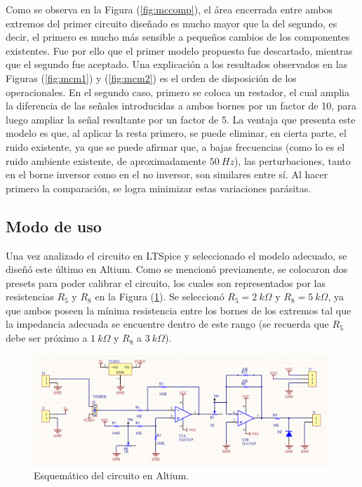 Como se observa en la Figura (\ref{fig:mccomp}), el área encerrada entre ambos extremos del primer circuito diseñado es mucho mayor que la del segundo, es decir, el primero es mucho más sensible a pequeños cambios de los componentes existentes. Fue por ello que el primer modelo propuesto fue descartado, mientras que el segundo fue aceptado. 
Una explicación a los resultados observados en las Figuras (\ref{fig:mcm1}) y (\ref{fig:mcm2}) es el orden de disposición de los operacionales. En el segundo caso, primero se coloca un restador, el cual amplia la diferencia de las señales introducidas a ambos bornes por un factor de 10, para luego ampliar la señal resultante por un factor de 5. La ventaja que presenta este modelo es que, al aplicar la resta primero, se puede eliminar, en cierta parte, el ruido existente, ya que se puede afirmar que, a bajas frecuencias (como lo es el ruido ambiente existente, de aproximadamente $50 \ Hz$), las perturbaciones, tanto en el borne inversor como en el no inversor, son similares entre sí. Al hacer primero la comparación, se logra minimizar estas variaciones parásitas.

\subsection{Modo de uso}

Una vez analizado el circuito en LTSpice y seleccionado el modelo adecuado, se diseñó este último en Altium. Como se mencionó previamente, se colocaron dos presets para poder calibrar el circuito, los cuales son representados por las resistencias $R_5$ y $R_8$ en la Figura (\ref{fig:schematic}). Se seleccionó $R_5 = 2 \ k\Omega$ y $R_8 = 5 \ k\Omega$, ya que ambos poseen la mínima resistencia entre los bornes de los extremos tal que la impedancia adecuada se encuentre dentro de este rango (se recuerda que $R_5$ debe ser próximo a $ 1 \ k\Omega$ y $R_8$ a $ 3 \ k\Omega$).

\begin{figure}[H]
	\centering
	\includegraphics[width=0.99\textwidth]{Ejercicio6/Imagenes/Schematic.png}
	\caption{Esquemático del circuito en Altium.}
	\label{fig:schematic}
\end{figure}

